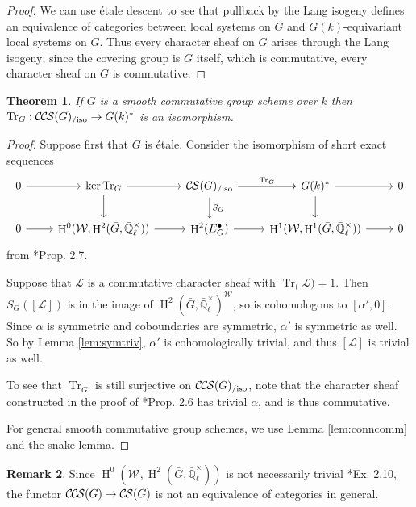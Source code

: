 \documentclass[10pt]{amsart}
\theoremstyle{plain}
\newtheorem{theorem}{Theorem}[section]
\theoremstyle{definition}
\newtheorem{remark}[theorem]{Remark}
\newcommand{\EE}{\mathbb{\bar Q}_\ell}
\newcommand{\Fq}{k}
\newcommand{\EEx}{\EE^\times}
\newcommand{\Weil}[1]{\mathcal{W}_{#1}}
\DeclareMathOperator{\Hh}{H}
\newcommand{\TrFrob}[1]{\operatorname{Tr}_{#1}}
\newcommand{\cs}[1]{{\mathcal{#1}}}
\newcommand{\CS}{{\mathcal{C\hskip-0.8pt S}}}
\newcommand{\CCS}{{\mathcal{C\hskip-.8pt C\hskip-0.8pt S}}}
\newcommand{\CSiso}[1]{\CS(#1)_{/\text{iso}}}
\newcommand{\CCSiso}[1]{\CCS(#1)_{/\text{iso}}}
\newcommand{\bG}{\bar{G}}
\begin{document}
\begin{proof}
We can use \'etale descent to see that pullback by the Lang isogeny defines an equivalence
of categories between local systems on $G$ and $G(\Fq)$-equivariant local systems on $G$.  Thus every character
sheaf on $G$ arises through the Lang isogeny; since the covering group is $G$ itself, which is commutative,
every character sheaf on $G$ is commutative.
\end{proof}

\begin{theorem} \label{thm:trfrobiso}
If $G$ is a smooth commutative group scheme over $\Fq$ then $\TrFrob{G} : \CCSiso{G} \to G(\Fq)^*$ is an isomorphism.
\end{theorem}

\begin{proof}
Suppose first that $G$ is \'etale.  Consider the isomorphism of short exact sequences
\[
\begin{tikzcd}
 0 \arrow{r} & \ker \TrFrob{G} \arrow{d} \arrow{r} & \CSiso{G}\arrow{d}{S_G} \arrow{r}{\TrFrob{G}} \arrow{r} & G(\Fq)^* \arrow{d} \arrow{r} & 0\\
  0 \arrow{r} & \Hh^0(\Weil{},\Hh^2(\bG,\EEx)) \arrow{r} & \Hh^2(E^\bullet_G) \arrow{r} & \Hh^1(\Weil{},\Hh^1(\bG,\EEx)) \arrow{r} & 0
 \end{tikzcd}
 \]
from \cite{cunningham-roe:13a}*{Prop. 2.7}.

Suppose that $\cs{L}$ is a commutative character sheaf
with $\TrFrob(\cs{L}) = 1$.  Then $S_G([\cs{L}])$ is in the image of $\Hh^2(\bG, \EEx)^\Weil{}$, so is cohomologous to
$[\alpha', 0]$.  Since $\alpha$ is symmetric and coboundaries are symmetric, $\alpha'$ is symmetric as well.
So by Lemma \ref{lem:symtriv}, $\alpha'$ is cohomologically trivial, and thus $[\cs{L}]$ is trivial as well.

To see that $\TrFrob{G}$ is still surjective on $\CCSiso{G}$, note that the character sheaf constructed in the proof of
\cite{cunningham-roe:13a}*{Prop. 2.6} has trivial $\alpha$, and is thus commutative.

For general smooth commutative group schemes, we use Lemma \ref{lem:conncomm} and the snake lemma.
\end{proof}

\begin{remark}
Since $\Hh^0(\Weil{},\Hh^2(\bG,\EEx))$ is not necessarily trivial \cite{cunningham-roe:13a}*{Ex. 2.10}, the functor
$\CCS(G) \to \CS(G)$ is not an equivalence of categories in general.
\end{remark}
\end{document}
